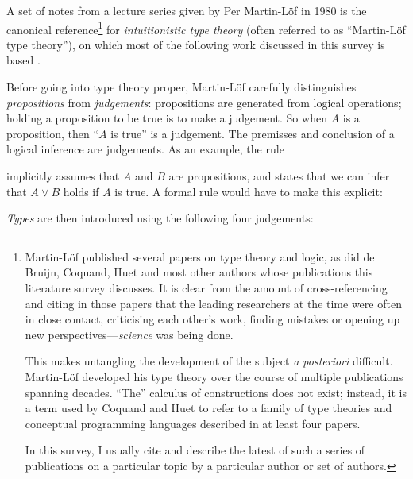 \documentclass[12pt,toc=bibliography,numbers=noendperiod,
               footnotes=multiple,twoside]{scrartcl}
\begin{document}
A set of notes from a lecture series given by Per Martin-Löf in 1980 is the canonical reference\footnote{%
Martin-Löf published several papers on type theory and logic, as did de Bruijn, Coquand, Huet and most other authors whose publications this literature survey discusses. It is clear from the amount of cross-referencing and citing in those papers that the leading researchers at the time were often in close contact, criticising each other's work, finding mistakes or opening up new perspectives---\emph{science} was being done.

This makes untangling the development of the subject \emph{a posteriori} difficult. Martin-Löf developed his type theory over the course of multiple publications spanning decades. \enquote{The} calculus of constructions does not exist; instead, it is a term used by Coquand and Huet to refer to a family of type theories and conceptual programming languages described in at least four papers.

In this survey, I usually cite and describe the latest of such a series of publications on a particular topic by a particular author or set of authors.}
%
for \emph{intuitionistic type theory} (often referred to as \enquote{Martin-Löf type theory}), on which most of the following work discussed in this survey is based \autocite{sambin_intuitionistic_1984}.

Before going into type theory proper, Martin-Löf carefully distinguishes \emph{propositions} from \emph{judgements}: propositions are generated from logical operations; holding a proposition to be true is to make a judgement. So when \(A\) is a proposition, then \enquote{\(A\) is true} is a judgement. The premisses and conclusion of a logical inference are judgements. As an example, the rule

\begin{prooftree}
\end{prooftree}

implicitly assumes that \(A\) and \(B\) are propositions, and states that we can infer that \(A \vee B\) holds if \(A\) is true. A formal rule would have to make this explicit:

\begin{prooftree}
\end{prooftree}

\emph{Types} are then introduced using the following four judgements:
\end{document}
